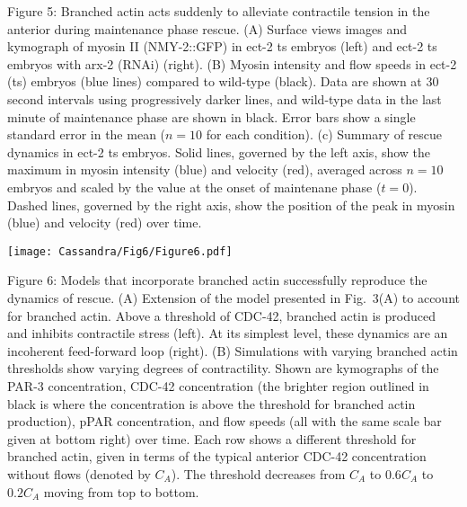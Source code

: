 \documentclass[11pt]{article}
\newcommand{\6}[1]{#1_{\text{6}}}
\newcommand{\3}[1]{#1_{\text{3}}}
\begin{document}
\newpage 
Figure 5: Branched actin acts suddenly to alleviate contractile tension in the anterior during maintenance phase rescue. (A) Surface views images and kymograph of myosin II (NMY-2::GFP) in ect-2 ts embryos (left) and ect-2 ts embryos with arx-2 (RNAi) (right). (B) Myosin intensity and flow speeds in ect-2 (ts) embryos (blue lines) compared to wild-type (black). Data are shown at 30 second intervals using progressively darker lines, and wild-type data in the last minute of maintenance phase are shown in black. Error bars show a single standard error in the mean ($n=10$ for each condition). (c) Summary of rescue dynamics in ect-2 ts embryos. Solid lines, governed by the left axis, show the maximum in myosin intensity (blue) and velocity (red), averaged across $n=10$ embryos and scaled by the value at the onset of maintenane phase ($t=0$). Dashed lines, governed by the right axis, show the position of the peak in myosin (blue) and velocity (red) over time.

\newpage 
\begin{center}
\texttt{[image: Cassandra/Fig6/Figure6.pdf]}
\end{center}

\newpage
Figure 6: Models that incorporate branched actin successfully reproduce the dynamics of rescue. (A) Extension of the model presented in Fig.\ 3(A) to account for branched actin. Above a threshold of CDC-42, branched actin is produced and inhibits contractile stress (left). At its simplest level, these dynamics are an incoherent feed-forward loop (right). (B) Simulations with varying branched actin thresholds show varying degrees of contractility. Shown are kymographs of the PAR-3 concentration, CDC-42 concentration (the brighter region outlined in black is where the concentration is above the threshold for branched actin production), pPAR concentration, and flow speeds (all with the same scale bar given at bottom right) over time. Each row shows a different threshold for branched actin, given in terms of the typical anterior CDC-42 concentration without flows (denoted by $C_A$). The threshold decreases from $C_A$ to $0.6C_A$ to $0.2C_A$ moving from top to bottom.




\end{document}
